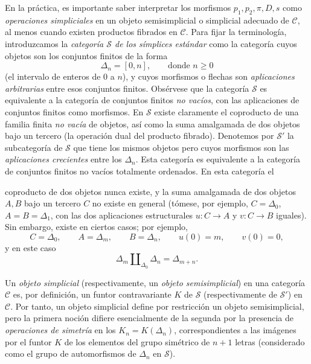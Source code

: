 \documentclass[11pt,twoside,openany]{book}
\numberwithin{equation}{section}
\newcommand{\src}[1]{%
  \phantomsection\hypertarget{src:#1}{}%
  \marginpar{\raggedleft\footnotesize\sffamily #1}%
}
\theoremstyle{plain}
\theoremstyle{definition}
\theoremstyle{remark}
\newcommand{\FgaUnitKey}{frontmatter}
\renewcommand{\src}[1]{%
  \phantomsection\hypertarget{src:\FgaUnitKey:#1}{}%
  \marginpar{\raggedleft\footnotesize\sffamily #1}%
}
\theoremstyle{plain}
\theoremstyle{definition}
\theoremstyle{remark}
\begin{document}
En la práctica, es importante saber interpretar los morfismos
$p_1,p_2,\pi,D,s$ como \emph{operaciones simpliciales} en un objeto
semisimplicial o simplicial adecuado de $\mathcal C$, al menos cuando existen
productos fibrados en $\mathcal C$. Para fijar la terminología, introduzcamos
la \emph{categoría $\mathcal S$ de los símplices estándar} como la categoría
cuyos objetos son los conjuntos finitos de la forma
\[
  \Delta_n=[0,n],\qquad\text{donde }n\geq 0
\]
(el intervalo de enteros de $0$ a $n$), y cuyos morfismos o flechas son
\emph{aplicaciones arbitrarias} entre esos conjuntos finitos. Obsérvese que la
categoría $\mathcal S$ es equivalente a la categoría de conjuntos finitos
\emph{no vacíos}, con las aplicaciones de conjuntos finitos como morfismos.
En $\mathcal S$ existe claramente el coproducto de una familia finita
\emph{no vacía} de objetos, así como la suma amalgamada de dos objetos bajo un tercero
(la operación dual del producto fibrado). Denotemos por $\mathcal S'$ la
subcategoría de $\mathcal S$ que tiene los mismos objetos pero cuyos morfismos
son las \emph{aplicaciones crecientes} entre los $\Delta_n$. Esta categoría es
equivalente a la categoría de conjuntos finitos no vacíos totalmente
ordenados. En esta categoría el
\src{108}
coproducto de dos objetos nunca existe, y la suma amalgamada de dos objetos $A,B$ bajo
un tercero $C$ no existe en general (tómese, por ejemplo, $C=\Delta_0$,
$A=B=\Delta_1$, con las dos aplicaciones estructurales $u:C\to A$ y
$v:C\to B$ iguales). Sin embargo, existe en ciertos casos; por ejemplo,
\[
  C=\Delta_0,\qquad A=\Delta_m,\qquad B=\Delta_n,\qquad
  u(0)=m,\qquad v(0)=0,
\]
y en este caso
\[
  \Delta_m\amalg_{\Delta_0}\Delta_n=\Delta_{m+n}.
\]

Un \emph{objeto simplicial} (respectivamente, un \emph{objeto
semisimplicial}) en una categoría $\mathcal C$ es, por definición, un funtor
contravariante $K$ de $\mathcal S$ (respectivamente de $\mathcal S'$) en
$\mathcal C$. Por tanto, un objeto simplicial define por restricción un objeto
semisimplicial, pero la primera noción difiere esencialmente de la segunda por
la presencia de \emph{operaciones de simetría} en los $K_n=K(\Delta_n)$,
correspondientes a las imágenes por el funtor $K$ de los elementos del grupo
simétrico de $n+1$ letras (considerado como el grupo de automorfismos de
$\Delta_n$ en $\mathcal S$).
\end{document}
